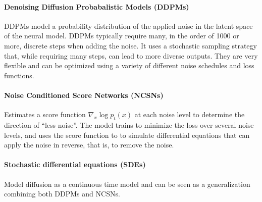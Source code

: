 \documentclass{article}
\begin{document}
\paragraph{Denoising Diffusion Probabalistic Models (DDPMs)} 
DDPMs model a probability distribution of the applied noise in the latent space of the neural model. DDPMs typically require many, in the order of 1000 or more, discrete steps when adding the noise. It uses a stochastic sampling strategy that, while requiring many steps, can lead to more diverse outputs. They are very flexible and can be optimized using a variety of different noise schedules and loss functions.

\paragraph{Noise Conditioned Score Networks (NCSNs)} 
Estimates a score function $\nabla_x \log p_t(x)$ at each noise level to determine the direction of ``less noise''. The model trains to minimize the loss over several noise levels, and uses the score function to to simulate differential equations that can apply the noise in reverse, that is, to remove the noise.

\paragraph{Stochastic differential equations (SDEs)} 
Model diffusion as a continuous time model and can be seen as a generalization combining both DDPMs and NCSNs.



\end{document}
